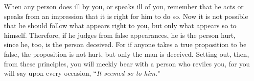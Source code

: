 When any person does ill by you, or speaks ill of you, remember that he
acts or speaks from an impression that it is right for him to do so. Now
it is not possible that he should follow what appears right to you, but
only what appears so to himself. Therefore, if he judges from false
appearances, he is the person hurt, since he, too, is the person
deceived. For if anyone takes a true proposition to be false, the
proposition is not hurt, but only the man is deceived. Setting out, then,
from these principles, you will meekly bear with a person who reviles
you, for you will say upon every occasion, ``\emph{It seemed so to him.}''
